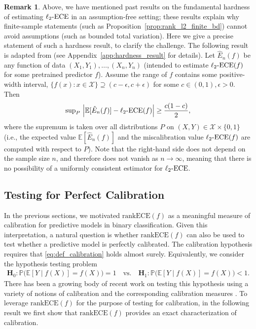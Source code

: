 \documentclass[11pt]{article}
\numberwithin{equation}{section}
\theoremstyle{definition}
\newtheorem{remark}{Remark}[section]
\newcommand{\E}{\mathbb{E}}
\renewcommand{\P}{\mathbb{P}}
\newcommand{\cX}{\mathcal{X}}
\newcommand{\ECE}{\mathrm{ECE}}
\newcommand{\lECE}{\ell_2\textnormal{-}\ECE}
\newcommand{\rankECE}{\mathrm{rankECE}}
\begin{document}
\begin{remark}\label{rmk:hardness_result}
    Above, we have mentioned past results on the fundamental hardness of estimating $\lECE$ in an assumption-free setting; these results explain why finite-sample statements (such as Proposition~\ref{prop:rank_l2_finite_bd}) cannot avoid assumptions (such as bounded total variation). Here we give a precise statement of such a hardness result, to clarify the challenge. The following result is adapted from \citet[Theorem 12.5]{angelopoulos2024theoretical} (see Appendix~\ref{app:hardness_result} for details). Let $\hat{E}_n(f)$ be any function of data $(X_1,Y_1),\dots,(X_n,Y_n)$ (intended to estimate $\lECE(f)$ for some pretrained predictor $f$). Assume the range of $f$ contains some positive-width interval, $\{f(x):x\in\cX\} \supseteq (c-\epsilon,c+\epsilon)$ for some $c\in(0,1),\epsilon>0$. Then 
    \[{\textstyle\sup_P} \,\left| \E[\hat{E}_n(f)] - \lECE(f)\right|\geq \frac{c(1-c)}{2},\]
    where the supremum is taken over all distributions $P$ on $(X,Y)\in\cX\times\{0,1\}$ (i.e., the expected value $\E[\hat{E}_n(f)]$ and the miscalibration value $\lECE(f)$ are computed with respect to $P$). Note that the right-hand side does not depend on the sample size $n$, and therefore does not vanish as $n\to\infty$, meaning that there is no possibility of a uniformly consistent estimator for $\lECE$.
\end{remark}

\subsection{Testing for Perfect Calibration}\label{sec:perfect_calib}
In the previous sections, we motivated $\rankECE(f)$ as a meaningful measure of calibration for predictive models in binary classification. Given this interpretation, a natural question is whether $\rankECE(f)$ can also be used to test whether a predictive model is perfectly calibrated. The calibration hypothesis requires that \eqref{eq:def_calibration} holds almost surely. Equivalently, we consider the hypothesis testing problem
\begin{align}\label{eq:null_calibration}
    \bm{H}_0: \P\Big(\E[Y\mid f(X)] = f(X)\Big) = 1
    \quad\text{vs.}\quad
    \bm{H}_1: \P\Big(\E[Y\mid f(X)] = f(X)\Big) < 1.
\end{align}
There has been a growing body of recent work on testing this hypothesis using a variety of notions of calibration and the corresponding calibration measures \citep{widmann2019calibration,glaser2023fast,gweon2023power,feng2024model,chatterjee2024kernel,lee2023t}. To leverage $\rankECE(f)$ for the purpose of testing for calibration, in the following result we first show that $\rankECE(f)$ provides an exact characterization of calibration.
\end{document}
